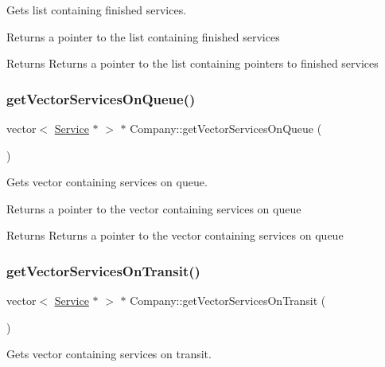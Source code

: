 Gets list containing finished services. 

Returns a pointer to the list containing finished services

\begin{DoxyReturn}{Returns}
Returns a pointer to the list containing pointers to finished services 
\end{DoxyReturn}
\mbox{\label{class_company_adffe3680413d999c922858c88fbd18a6}} 
\subsubsection{\texorpdfstring{get\+Vector\+Services\+On\+Queue()}{getVectorServicesOnQueue()}}
{\footnotesize\ttfamily vector$<$ \hyperlink{class_service}{Service} $\ast$ $>$ $\ast$ Company\+::get\+Vector\+Services\+On\+Queue (\begin{DoxyParamCaption}{ }\end{DoxyParamCaption})}



Gets vector containing services on queue. 

Returns a pointer to the vector containing services on queue

\begin{DoxyReturn}{Returns}
Returns a pointer to the vector containing services on queue 
\end{DoxyReturn}
\mbox{\label{class_company_ab83ddbd16558f0e99efa7c56878e0ec8}} 
\subsubsection{\texorpdfstring{get\+Vector\+Services\+On\+Transit()}{getVectorServicesOnTransit()}}
{\footnotesize\ttfamily vector$<$ \hyperlink{class_service}{Service} $\ast$ $>$ $\ast$ Company\+::get\+Vector\+Services\+On\+Transit (\begin{DoxyParamCaption}{ }\end{DoxyParamCaption})}



Gets vector containing services on transit. 

